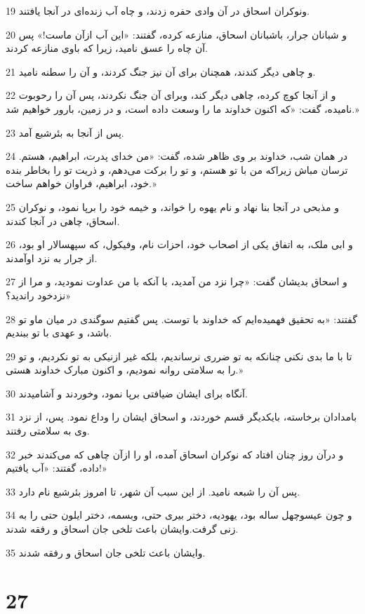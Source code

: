 \par 19 ونوکران اسحاق در آن وادی حفره زدند، و چاه آب زنده‌ای در آنجا یافتند.
\par 20 و شبانان جرار، باشبانان اسحاق، منازعه کرده، گفتند: «این آب ازآن ماست!» پس آن چاه را عسق نامید، زیرا که باوی منازعه کردند.
\par 21 و چاهی دیگر کندند، همچنان برای آن نیز جنگ کردند، و آن را سطنه نامید.
\par 22 و از آنجا کوچ کرده، چاهی دیگر کند، وبرای آن جنگ نکردند، پس آن را رحوبوت نامیده، گفت: «که اکنون خداوند ما را وسعت داده است، و در زمین، بارور خواهیم شد.»
\par 23 پس از آنجا به بئرشبع آمد.
\par 24 در همان شب، خداوند بر وی ظاهر شده، گفت: «من خدای پدرت، ابراهیم، هستم. ترسان مباش زیراکه من با تو هستم، و تو را برکت می‌دهم، و ذریت تو را بخاطر بنده خود، ابراهیم، فراوان خواهم ساخت.»
\par 25 و مذبحی در آنجا بنا نهاد و نام یهوه را خواند، و خیمه خود را برپا نمود، و نوکران اسحاق، چاهی در آنجا کندند.
\par 26 و ابی ملک، به اتفاق یکی از اصحاب خود، احزات نام، وفیکول، که سپهسالار او بود، از جرار به نزد اوآمدند.
\par 27 و اسحاق بدیشان گفت: «چرا نزد من آمدید، با آنکه با من عداوت نمودید، و مرا از نزدخود راندید؟»
\par 28 گفتند: «به تحقیق فهمیده‌ایم که خداوند با توست. پس گفتیم سوگندی در میان ماو تو باشد، و عهدی با تو ببندیم.
\par 29 تا با ما بدی نکنی چنانکه به تو ضرری نرساندیم، بلکه غیر ازنیکی به تو نکردیم، و تو را به سلامتی روانه نمودیم، و اکنون مبارک خداوند هستی.»
\par 30 آنگاه برای ایشان ضیافتی برپا نمود، وخوردند و آشامیدند.
\par 31 بامدادان برخاسته، بایکدیگر قسم خوردند، و اسحاق ایشان را وداع نمود. پس، از نزد وی به سلامتی رفتند.
\par 32 و درآن روز چنان افتاد که نوکران اسحاق آمده، او را ازآن چاهی که می‌کندند خبر داده، گفتند: «آب یافتیم!»
\par 33 پس آن را شبعه نامید. از این سبب آن شهر، تا امروز بئرشبع نام دارد.
\par 34 و چون عیسوچهل ساله بود، یهودیه، دختر بیری حتی، وبسمه، دختر ایلون حتی را به زنی گرفت.وایشان باعث تلخی جان اسحاق و رفقه شدند.
\par 35 وایشان باعث تلخی جان اسحاق و رفقه شدند.
 
\chapter{27}

